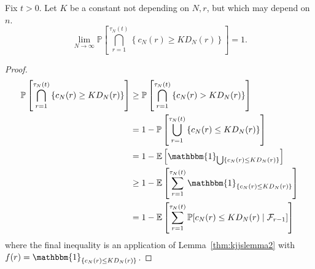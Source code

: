 \documentclass{article}
\newcommand{\Prob}{\mathbb{P}}
\newcommand{\E}{\mathbb{E}}
\newcommand{\I}[1]{\mathbbm{1}_{\{#1\}}}
\newcommand{\1}[1]{\mathbbm{1}_{#1}}
\begin{document}
\begin{lemma}\label{thm:indicators_DN}
Fix $t>0$.
Let $K$ be a constant not depending on $N, r$, but which may depend on $n$.
\begin{equation}
\lim_{N\to\infty} \Prob \left[ \bigcap_{r=1}^{\tau_N(t)} 
        \left\{ c_N(r) \geq K D_N(r) \right\} \right] 
= 1 . 
\end{equation}
\end{lemma}

\begin{proof}
\begin{align}
\Prob \left[ \bigcap_{r=1}^{\tau_N(t)} 
        \left\{ c_N(r) \geq K D_N(r) \right\} \right]
&\geq \Prob \left[ \bigcap_{r=1}^{\tau_N(t)} 
        \left\{ c_N(r) > K D_N(r) \right\} \right] \notag\\
&= 1- \Prob \left[ \bigcup_{r=1}^{\tau_N(t)} 
        \left\{ c_N(r) \leq K D_N(r) \right\} \right] \notag\\
&= 1- \E \left[ \1{\bigcup \{ c_N(r) \leq K D_N(r) \} } \right] \notag\\
&\geq 1- \E \left[ \sum_{r=1}^{\tau_N(t)} \I{ c_N(r) \leq K D_N(r) } \right]
        \notag\\
&= 1- \E \left[ \sum_{r=1}^{\tau_N(t)} \Prob[ c_N(r) \leq K D_N(r) 
        \mid \mathcal{F}_{r-1} ] \right] \label{eq:050}
\end{align}
where the final inequality is an application of Lemma~\ref{thm:kjjslemma2} with $f(r) = \I{ c_N(r) \leq K D_N(r) }$.


\end{proof}
\end{document}
